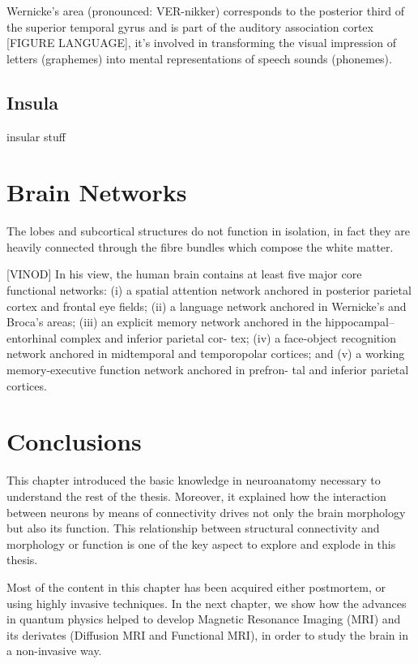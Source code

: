 Wernicke’s area (pronounced: VER-nikker) corresponds to the posterior third of the superior temporal gyrus and is part of the auditory association cortex [FIGURE LANGUAGE], it's involved in transforming the visual impression of letters (graphemes) into mental representations of speech sounds (phonemes).

\subsection{Insula}

insular stuff


\section{Brain Networks}

The lobes and subcortical structures do not function in isolation, in fact they are heavily connected through the fibre bundles which compose the white matter.

[VINOD]
In his view, the human brain contains at least five major core functional networks: (i) a spatial attention network anchored in posterior parietal cortex and frontal eye fields;
(ii) a language network anchored in Wernicke’s and Broca’s areas; (iii) an explicit memory network anchored in the hippocampal–entorhinal complex and inferior parietal cor- tex; (iv) a face-object recognition network anchored in
midtemporal and temporopolar cortices; and (v) a working memory-executive function network anchored in prefron- tal and inferior parietal cortices. 

\section{Conclusions}
This chapter introduced the basic knowledge in neuroanatomy necessary to
understand the rest of the thesis. Moreover, it explained how the interaction
between neurons by means of connectivity drives not only the brain morphology
but also its function. This relationship between structural connectivity and 
morphology or function is one of the key aspect to explore and explode in this
thesis.

Most of the content in this chapter has been acquired either postmortem, or
using highly invasive techniques. In the next chapter, we show how the advances
in quantum physics helped to develop Magnetic Resonance Imaging (MRI) and its
derivates (Diffusion MRI and Functional MRI), in order to study the brain in a
non-invasive way.


\chapterbib
